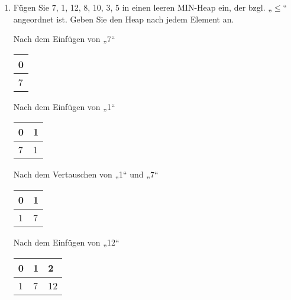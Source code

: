 \documentclass{bschlangaul-aufgabe}
\begin{document}
\begin{enumerate}
\begin{enumerate}

\item Fügen Sie 7, 1, 12, 8, 10, 3, 5 in einen leeren MIN-Heap ein,
der bzgl. „$\leq$“ angeordnet ist.
Geben Sie den Heap nach jedem Element an.

\begin{bBaum}{Nach dem Einfügen von „7“}
\begin{tabular}{l}
\bf{0} \\
\hline
7      \\
\end{tabular}

\end{bBaum}

\begin{bBaum}{Nach dem Einfügen von „1“}
\begin{tabular}{ll}
\bf{0} & \bf{1} \\
\hline
7      & 1      \\
\end{tabular}

\end{bBaum}

\begin{bBaum}{Nach dem Vertauschen von „1“ und „7“}
\begin{tabular}{ll}
\bf{0} & \bf{1} \\
\hline
1      & 7      \\
\end{tabular}

\end{bBaum}

\begin{bBaum}{Nach dem Einfügen von „12“}
\begin{tabular}{lll}
\bf{0} & \bf{1} & \bf{2} \\
\hline
1      & 7      & 12     \\
\end{tabular}

\end{bBaum}


\end{enumerate}
\end{enumerate}
\end{document}
